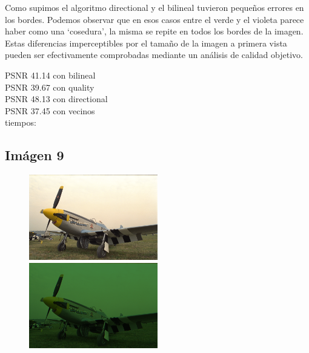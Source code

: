 Como supimos el algoritmo directional y el bilineal tuvieron pequeños errores en los bordes. Podemos observar que en esos casos entre el verde y el violeta parece haber como una `cosedura', la misma se repite en todos los bordes de la imagen. Estas diferencias imperceptibles por el tamaño de la imagen a primera vista pueden ser efectivamente comprobadas mediante un análisis de calidad objetivo. 

PSNR 41.14 con bilineal\\
PSNR 39.67 con quality\\
PSNR 48.13 con directional\\
PSNR 37.45 con vecinos\\

tiempos:

\newpage

\subsection{Imágen 9}

\begin{figure}
       \includegraphics[width=0.5\textwidth]{imagenes/img9.png}
           \hfill
        \includegraphics[width=0.5\textwidth]{imagenes/img9_bayer.png}
\end{figure}

